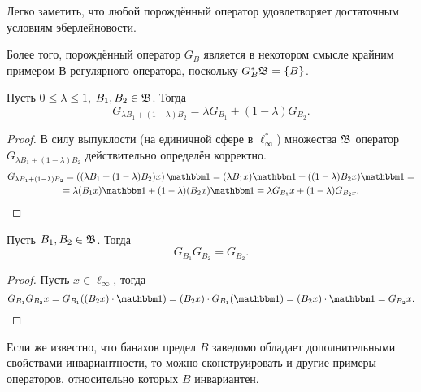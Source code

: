 \begin{remark}
	Легко заметить, что любой порождённый оператор удовлетворяет достаточным условиям эберлейновости.
\end{remark}

\begin{remark}
	Более того, порождённый оператор $G_B$ является в некотором смысле крайним примером В-регулярного оператора,
	поскольку $G_B^* \mathfrak{B} = \{B\}$.
\end{remark}

\begin{lemma}
	Пусть $0 \leq \lambda \leq 1$, $B_1, B_2 \in \mathfrak{B}$.
	Тогда
	\begin{equation}
		G_{\lambda B_1+(1-\lambda) B_2} =\lambda G_{B_1} + (1-\lambda)G_{B_2}
		.
	\end{equation}
\end{lemma}


\begin{proof}
	В силу выпуклости (на единичной сфере в $\ell_\infty^*$) множества $\mathfrak{B}$ оператор $G_{\lambda B_1+(1-\lambda) B_2}$
	действительно определён корректно.
	\begin{multline}
		G_{\lambda B_1+(1-\lambda) B_2} =
		\left((\lambda B_1+(1-\lambda) B_2) x\right)\one =
		(\lambda B_1 x) \one +((1-\lambda) B_2 x)\one =
		\\=
		\lambda (B_1 x) \one +(1-\lambda) (B_2 x)\one =
		\lambda G_{B_1} x +(1-\lambda) G_{B_2 x}
		.
	\end{multline}
\end{proof}


\begin{lemma}
	Пусть $B_1, B_2 \in \mathfrak{B}$.
	Тогда
	\begin{equation}
		G_{B_1} G_{B_2} = G_{B_2}
		.
	\end{equation}
\end{lemma}
\begin{proof}
	Пусть $x\in\ell_\infty$, тогда
	\begin{equation}
		G_{B_1}G_{B_2}x =
		G_{B_1} ( (B_2 x) \cdot \one ) =
		(B_2 x) \cdot G_{B_1} ( \one ) =
		(B_2 x) \cdot  \one =
		G_{B_2}x
		.
	\end{equation}
\end{proof}


Если же известно, что банахов предел $B$ заведомо обладает дополнительными свойствами инвариантности,
то можно сконструировать и другие примеры операторов, относительно которых $B$ инвариантен.

